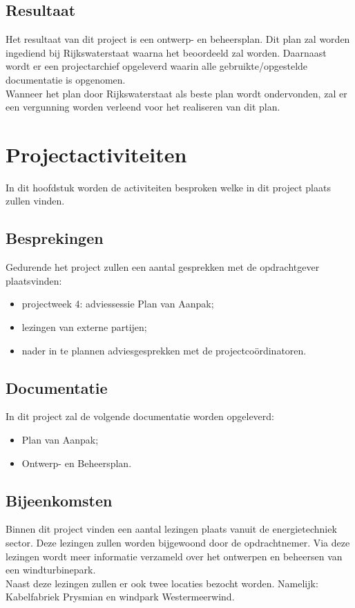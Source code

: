 \documentclass[numbers=endperiod]{scrartcl}
\newcommand{\sectionSmall}[1]{
	\vspace{-10pt}
	\section{#1}
	\vspace{-5pt}
}
\newcommand{\whitespace}{\vspace*{2 mm} \\}%
\begin{document}
	\subsection{Resultaat}	
	Het resultaat van dit project is een ontwerp- en beheersplan. Dit plan zal worden ingediend bij Rijkswaterstaat waarna het beoordeeld zal worden. Daarnaast wordt er een projectarchief opgeleverd waarin alle gebruikte/opgestelde documentatie is opgenomen.
	\whitespace
	Wanneer het plan door Rijkswaterstaat als beste plan wordt ondervonden, zal er een vergunning worden verleend voor het realiseren van dit plan.
	
	\sectionSmall{Projectactiviteiten}
	In dit hoofdstuk worden de activiteiten besproken welke in dit project plaats zullen vinden.
	\subsection{Besprekingen}
	Gedurende het project zullen een aantal gesprekken met de opdrachtgever plaatsvinden:
	\begin{itemize}
		\item projectweek 4: adviessessie Plan van Aanpak;
		\item lezingen van externe partijen;
		\item nader in te plannen adviesgesprekken met de projectcoördinatoren.
	\end{itemize}
	\subsection{Documentatie}
	In dit project zal de volgende documentatie worden opgeleverd:
	\begin{itemize}
		\item Plan van Aanpak;
		\item Ontwerp- en Beheersplan.
	\end{itemize}
	
	\subsection{Bijeenkomsten}
	Binnen dit project vinden een aantal lezingen plaats vanuit de energietechniek sector. Deze lezingen zullen worden bijgewoond door de opdrachtnemer. Via deze lezingen wordt meer informatie verzameld over het ontwerpen en beheersen van een windturbinepark.
	\whitespace
	Naast deze lezingen zullen er ook twee locaties bezocht worden. Namelijk: Kabelfabriek Prysmian en windpark Westermeerwind.
	
\end{document}
